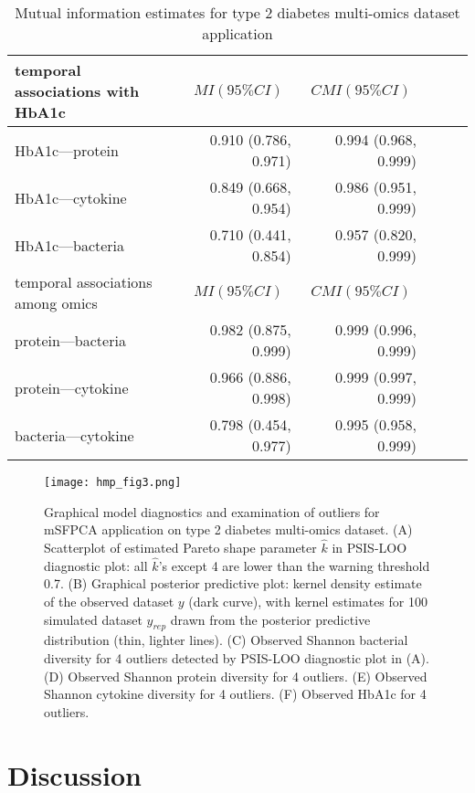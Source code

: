 \documentclass[aoas,preprint]{imsart}
\begin{document}
\begin{table*}
\caption{Mutual information estimates for type 2 diabetes multi-omics dataset application}
\label{t2d_table}
\begin{tabular}{@{}lrrrrc@{}}
\hline
temporal associations with HbA1c 
& \multicolumn{1}{c}{$MI (95\% CI)$}
& \multicolumn{1}{c}{$CMI (95\% CI)$} \\
\hline
HbA1c---protein    & 0.910 (0.786, 0.971) & 0.994 (0.968, 0.999)  \\
HbA1c---cytokine    & 0.849 (0.668, 0.954)  & 0.986 (0.951, 0.999)  \\
HbA1c---bacteria    & 0.710 (0.441, 0.854)  & 0.957 (0.820, 0.999)  \\
\hline
temporal associations among omics
& \multicolumn{1}{c}{$MI (95\% CI)$}
& \multicolumn{1}{c}{$CMI (95\% CI)$} \\
\hline
protein---bacteria    & 0.982 (0.875, 0.999) & 0.999 (0.996, 0.999)  \\
protein---cytokine    & 0.966 (0.886, 0.998)  & 0.999 (0.997, 0.999)  \\
bacteria---cytokine    & 0.798 (0.454, 0.977)  & 0.995 (0.958, 0.999)  \\
\hline
\end{tabular}
\end{table*}

\begin{figure}
\texttt{[image: hmp\_fig3.png]}
\caption{Graphical model diagnostics and examination of outliers for mSFPCA application on type 2 diabetes multi-omics dataset. (A) Scatterplot of estimated Pareto shape parameter $\hat k$ in PSIS-LOO diagnostic plot: all $\hat k$’s except 4 are lower than the warning threshold 0.7. (B) Graphical posterior predictive plot: kernel density estimate of the observed dataset $y$ (dark curve), with kernel estimates for 100 simulated dataset $y_{rep}$ drawn from the posterior predictive distribution (thin, lighter lines). (C) Observed Shannon bacterial diversity for 4 outliers detected by PSIS-LOO diagnostic plot in (A). (D) Observed Shannon protein diversity for 4 outliers. (E) Observed Shannon cytokine diversity for 4 outliers. (F) Observed HbA1c for 4 outliers.
}
\label{t2d_fig3}
\end{figure}

\section{Discussion}
\end{document}
